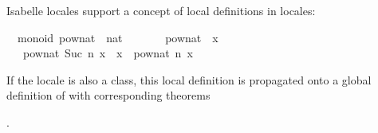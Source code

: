 \begin{isabellebody}
\begin{isamarkuptext}
\end{isamarkuptext}%
\isamarkuptrue%
%
\isamarkuptrue%
%
\begin{isamarkuptext}%
Isabelle locales support a concept of local definitions
  in locales:%
\end{isamarkuptext}%
\isamarkuptrue%
%
\isadelimquote
%
\endisadelimquote
%
\isatagquote
{}\isamarkupfalse%
\ {\isacharparenleft}\ monoid{\isacharparenright}\ pow{\isacharunderscore}nat\ {\isacharcolon}{\isacharcolon}\ {\isachardoublequoteopen}nat\ {\isasymRightarrow}\ {\isasymalpha}\ {\isasymRightarrow}\ {\isasymalpha}{\isachardoublequoteclose}\ \isanewline
\ \ {\isachardoublequoteopen}pow{\isacharunderscore}nat\ {}\ x\ {\isacharequal}\ {\isasymone}{\isachardoublequoteclose}\isanewline
\ \ {\isacharbar}\ {\isachardoublequoteopen}pow{\isacharunderscore}nat\ {\isacharparenleft}Suc\ n{\isacharparenright}\ x\ {\isacharequal}\ x\ {\isasymotimes}\ pow{\isacharunderscore}nat\ n\ x{\isachardoublequoteclose}%
\endisatagquote
{\isafoldquote}%
%
\isadelimquote
%
\endisadelimquote
%
\begin{isamarkuptext}%
\noindent If the locale  is also a class, this local
  definition is propagated onto a global definition of
  with corresponding theorems

  .


\end{isamarkuptext}
\end{isabellebody}
